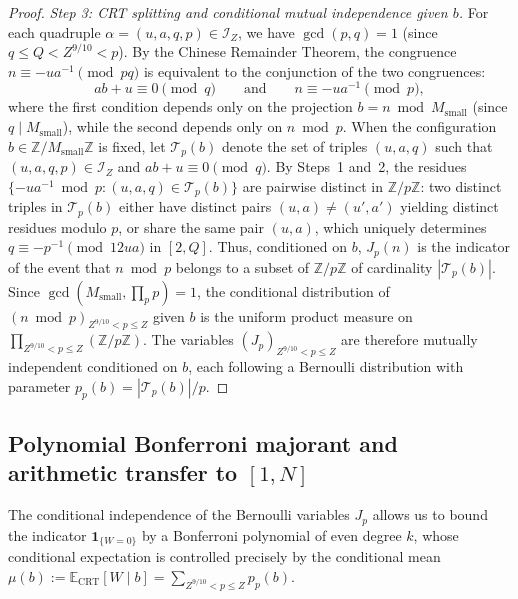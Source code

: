 \documentclass[11pt, a4paper]{article}
\theoremstyle{plain}
\theoremstyle{definition}
\newcommand{\Z}{\mathbb{Z}}
\newcommand{\Ebb}{\mathbb{E}}
\newcommand{\ind}{\mathbf{1}}
\begin{document}
\begin{proof}
\medskip\noindent\emph{Step 3: CRT splitting and conditional mutual independence given $b$.}
For each quadruple $\alpha = (u,a,q,p) \in \mathcal{I}_Z$, we have $\gcd(p, q) = 1$ (since $q \le Q < Z^{9/10} < p$). By the Chinese Remainder Theorem, the congruence $n \equiv -u a^{-1} \pmod{pq}$ is equivalent to the conjunction of the two congruences:
\[
ab + u \equiv 0 \pmod q \qquad \text{and} \qquad n \equiv -u a^{-1} \pmod p,
\]
where the first condition depends only on the projection $b = n \bmod M_{\mathrm{small}}$ (since $q \mid M_{\mathrm{small}}$), while the second depends only on $n \bmod p$. When the configuration $b \in \Z / M_{\mathrm{small}} \Z$ is fixed, let $\mathcal{T}_p(b)$ denote the set of triples $(u,a,q)$ such that $(u,a,q,p) \in \mathcal{I}_Z$ and $ab + u \equiv 0 \pmod q$. By Steps~1 and~2, the residues $\{-u a^{-1} \bmod p : (u,a,q) \in \mathcal{T}_p(b)\}$ are pairwise distinct in $\Z / p\Z$: two distinct triples in $\mathcal{T}_p(b)$ either have distinct pairs $(u,a) \ne (u',a')$ yielding distinct residues modulo $p$, or share the same pair $(u,a)$, which uniquely determines $q \equiv -p^{-1} \pmod{12ua}$ in $[2, Q]$. Thus, conditioned on $b$, $J_p(n)$ is the indicator of the event that $n \bmod p$ belongs to a subset of $\Z / p\Z$ of cardinality $|\mathcal{T}_p(b)|$. Since $\gcd(M_{\mathrm{small}}, \prod_p p) = 1$, the conditional distribution of $(n \bmod p)_{Z^{9/10} < p \le Z}$ given $b$ is the uniform product measure on $\prod_{Z^{9/10} < p \le Z} (\Z / p\Z)$. The variables $(J_p)_{Z^{9/10} < p \le Z}$ are therefore mutually independent conditioned on $b$, each following a Bernoulli distribution with parameter $p_p(b) = |\mathcal{T}_p(b)| / p$.
\end{proof}

\subsection{Polynomial Bonferroni majorant and arithmetic transfer to $[1,N]$}\label{subsec:bonferroni_transfert}
The conditional independence of the Bernoulli variables $J_p$ allows us to bound the indicator $\ind_{\{W=0\}}$ by a Bonferroni polynomial of even degree $k$, whose conditional expectation is controlled precisely by the conditional mean $\mu(b) := \Ebb_{\mathrm{CRT}}[W \mid b] = \sum_{Z^{9/10} < p \le Z} p_p(b)$.
\end{document}
